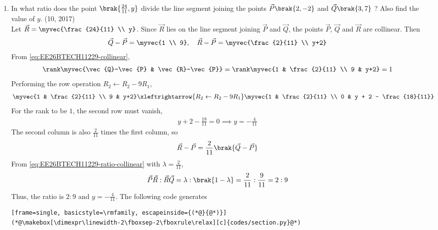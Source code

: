 \begin{enumerate}[label=\thesubsection.\arabic*, ref=\thesubsection.\theenumi]
\item 
In what ratio does the point $\brak{\frac{24}{11}, y}$ divide the line segment joining the points $\vec{P}\brak{2, -2}$ and $\vec{Q}\brak{3, 7}$ ? Also find the value of $y$.
\hfill (10, 2017)
\\
\solution
Let $\vec{R} = \myvec{\frac{24}{11} \\ y}$. Since $\vec{R}$ lies on the line segment joining $\vec{P}$ and $\vec{Q}$, the points $\vec{P}$, $\vec{Q}$ and $\vec{R}$ are collinear. Then
\begin{align}
	\vec{Q} - \vec{P} = \myvec{1 \\ 9}, \quad \vec{R} - \vec{P} = \myvec{\frac{2}{11} \\ y+2}
\end{align}
From \eqref{eq:EE26BTECH11229-collinear},
\begin{align}
	\rank\myvec{\vec{Q}-\vec{P} & \vec{R}-\vec{P}} = \rank\myvec{1 & \frac{2}{11} \\ 9 & y+2} = 1
\end{align}
Performing the row operation $R_2 \leftarrow R_2 - 9R_1$,
\begin{align}
	\myvec{1 & \frac{2}{11} \\ 9 & y+2} \xleftrightarrow{R_2 \leftarrow R_2 - 9R_1} \myvec{1 & \frac{2}{11} \\ 0 & y + 2 - \frac{18}{11}}
\end{align}
For the rank to be $1$, the second row must vanish,
\begin{align}
	y + 2 - \frac{18}{11} = 0 \implies y = -\frac{4}{11}
\end{align}
The second column is also $\frac{2}{11}$ times the first column, so
\begin{align}
	\vec{R} - \vec{P} = \frac{2}{11}\brak{\vec{Q} - \vec{P}}
\end{align}
From \eqref{eq:EE26BTECH11229-ratio-collinear} with $\lambda = \frac{2}{11}$,
\begin{align}
	\vec{P}\vec{R} : \vec{R}\vec{Q} = \lambda : \brak{1-\lambda} = \frac{2}{11} : \frac{9}{11} = 2 : 9
\end{align}
Thus, the ratio is $2:9$ and $y = -\frac{4}{11}$.
The following code generates 
\begin{lstlisting}[frame=single, basicstyle=\rmfamily, escapeinside={(*@}{@*)}]
(*@\makebox[\dimexpr\linewidth-2\fboxsep-2\fboxrule\relax][c]{codes/section.py}@*)
\end{lstlisting}
\begin{figure}[H]

\end{figure}
\end{enumerate}

